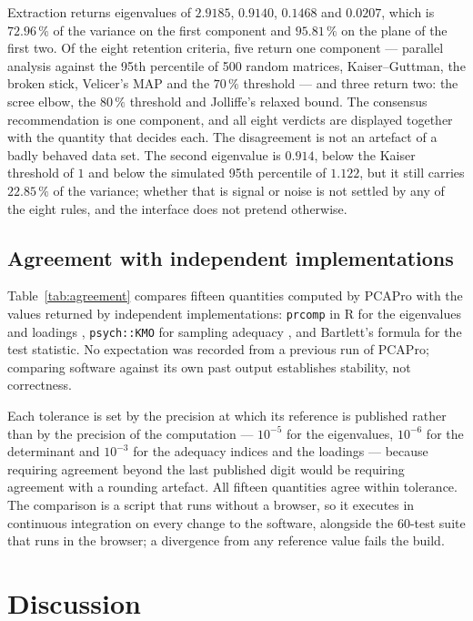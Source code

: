 \documentclass[12pt]{article}
\begin{document}
Extraction returns eigenvalues of $2.9185$, $0.9140$, $0.1468$ and $0.0207$,
which is $72.96\,\%$ of the variance on the first component and $95.81\,\%$ on
the plane of the first two. Of the eight retention criteria, five return one
component --- parallel analysis against the 95th percentile of 500 random
matrices, Kaiser--Guttman, the broken stick, Velicer's MAP and the $70\,\%$
threshold --- and three return two: the scree elbow, the $80\,\%$ threshold and
Jolliffe's relaxed bound. The consensus recommendation is one component, and
all eight verdicts are displayed together with the quantity that decides each.
The disagreement is not an artefact of a badly behaved data set. The second
eigenvalue is $0.914$, below the Kaiser threshold of $1$ and below the
simulated 95th percentile of $1.122$, but it still carries $22.85\,\%$ of the
variance; whether that is signal or noise is not settled by any of the eight
rules, and the interface does not pretend otherwise.

\subsection{Agreement with independent implementations}

Table~\ref{tab:agreement} compares fifteen quantities computed by PCAPro with
the values returned by independent implementations: \texttt{prcomp} in R for
the eigenvalues and loadings \citep{R}, \texttt{psych::KMO} for sampling
adequacy \citep{psych}, and Bartlett's formula for the test statistic. No
expectation was recorded from a previous run of PCAPro; comparing software
against its own past output establishes stability, not correctness.

Each tolerance is set by the precision at which its reference is published
rather than by the precision of the computation --- $10^{-5}$ for the
eigenvalues, $10^{-6}$ for the determinant and $10^{-3}$ for the adequacy
indices and the loadings --- because requiring agreement beyond the last
published digit would be requiring agreement with a rounding artefact. All
fifteen quantities agree within tolerance. The comparison is a script that runs
without a browser, so it executes in continuous integration on every change to
the software, alongside the 60-test suite that runs in the browser; a
divergence from any reference value fails the build.

\section{Discussion}
\end{document}
